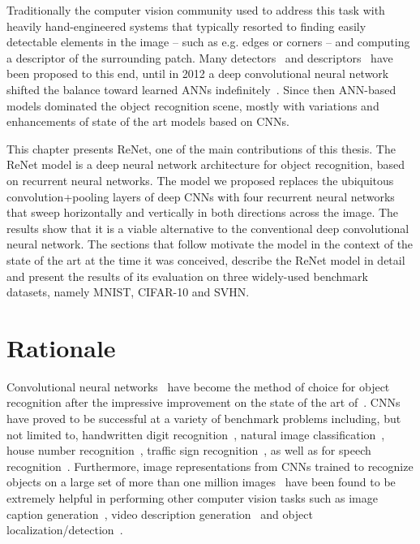 Traditionally the computer vision community used to address this task with
heavily hand-engineered systems that typically resorted to finding easily
detectable elements in the image -- such as e.g. edges or corners -- and
computing a descriptor of the surrounding patch. Many detectors~\cite{
dufournaud2000matching,harris1988combined,mikolajczyk2001indexing,
lowe2004distinctive,mikolajczyk2005performance} and descriptors~\cite{
lowe1999object,mikolajczyk2005performance,belongie2002shape} have been proposed
to this end, until in 2012 a deep convolutional neural network shifted the
balance toward learned ANNs indefinitely~\citep{Krizhevsky-2012}. Since then
ANN-based models dominated the object recognition scene, mostly with variations
and enhancements of state of the art models based on CNNs.

This chapter presents ReNet, one of the main contributions of this thesis.
The ReNet model is a deep neural network architecture for object recognition,
based on recurrent neural networks. The model we proposed replaces the
ubiquitous convolution+pooling layers of deep CNNs with four recurrent neural
networks that sweep horizontally and vertically in both directions across the
image. The results show that it is a viable alternative to the conventional
deep convolutional neural network. The sections that follow motivate the model
in the context of the state of the art at the time it was conceived, describe
the ReNet model in detail and present the results of its evaluation on three
widely-used benchmark datasets, namely MNIST, CIFAR-10 and SVHN.

\section{Rationale}
Convolutional neural networks~\cite[CNN,][]{Fukushima80,LeCun89} have become the
method of choice for object recognition after the impressive improvement on the
state of the art of~\cite{Krizhevsky-2012}. CNNs have proved to be successful
at a variety of benchmark problems including, but not limited to, handwritten
digit recognition~\citep[see, e.g.,][]{Ciresan-2012}, natural image
classification~\citep[see, e.g.,][]{Lin2014,Simonyan2015,szegedy2014going},
house number recognition~\citep[see, e.g.,][]{Goodfellow+et+al-ICLR2014a},
traffic sign recognition~\citep[see, e.g.,][]{Ciresan-et-al-2012}, as well as
for speech recognition~\citep[see, e.g.,][]{Hamid2012, sainath2013,
toth2014combining}.  Furthermore, image representations from CNNs trained to
recognize objects on a large set of more than one million
images~\citep{Simonyan2015,szegedy2014going} have been found to be extremely
helpful in performing other computer vision tasks such as image caption
generation~\citep[see, e.g.,][]{Vinyals-et-al-arxiv2014,Xu-et-al-arxiv2015},
video description generation~\citep[see, e.g.,][]{Li2015} and object
localization/detection~\citep[see, e.g.,][]{Sermanet14}.

